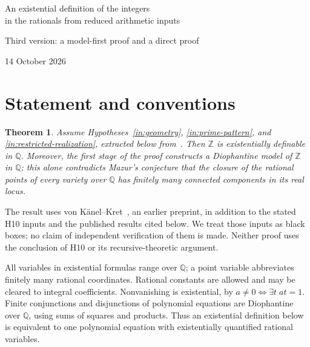 \documentclass[11pt]{article}
\newtheorem{theorem}{Theorem}[section]
\theoremstyle{definition}\newtheorem{inputthm}[theorem]{Hypothesis}
\theoremstyle{remark}\newtheorem{remark}[theorem]{Remark}
\newcommand{\Q}{\mathbb Q}\newcommand{\Z}{\mathbb Z}
\begin{document}
\begin{center}
{\Large An existential definition of the integers\\[2pt]
in the rationals from reduced arithmetic inputs}\par
\vspace{5pt}Third version: a model-first proof and a direct proof\par
14 October 2026
\end{center}
\begin{abstract}
We give two existential definitions of $\Z$ in $\Q$, conditional on
three specified inputs from the OpenAI H10 manuscript: a geometric
family, restricted simultaneous point existence, and prime-contact
representations. An earlier height theorem of von K\"anel--Kret replaces
the manuscript's arithmetic height engine. Classical descent and formal
groups supply the other arithmetic ingredients. A finite certificate
first yields a Diophantine model of $\Z$, which already refutes Mazur's
finite-component conjecture; DPRM then identifies the actual integers.
A separate proof replaces this last use of the model by Lucas growth.
All certificates are constructed explicitly as finite existential formulas.
\end{abstract}

\section{Statement and conventions}

\begin{theorem}\label{thm:main}
Assume Hypotheses~\ref{in:geometry}, \ref{in:prime-pattern}, and
\ref{in:restricted-realization}, extracted below from~\cite{H10}.
Then $\Z$ is existentially definable in $\Q$. Moreover, the first
stage of the proof constructs a Diophantine model of $\Z$ in $\Q$;
this alone contradicts Mazur's conjecture that the closure of the
rational points of every variety over $\Q$ has finitely many connected
components in its real locus.
\end{theorem}

The result uses von K\"anel--Kret~\cite{vKK}, an earlier preprint,
in addition to the stated H10 inputs and the published results cited
below. We treat those inputs as black boxes; no claim of independent
verification of them is made. Neither proof uses the conclusion of H10
or its recursive-theoretic argument.

All variables in existential formulas range over $\Q$; a point variable
abbreviates finitely many rational coordinates. Rational constants are
allowed and may be cleared to integral coefficients. Nonvanishing is
existential, by $a\ne0\iff\exists t\;at=1$. Finite conjunctions and
disjunctions of polynomial equations are Diophantine over $\Q$, using
sums of squares and products. Thus an existential definition below is
equivalent to one polynomial equation with existentially quantified
rational variables.
\end{document}
